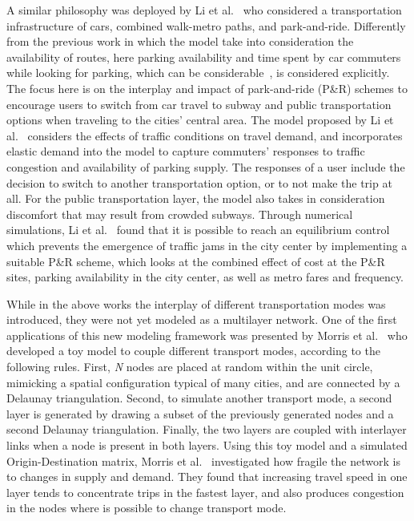 A similar philosophy was deployed by Li et al.~\cite{li2007parkride} who considered a transportation infrastructure of cars, combined walk-metro paths, and park-and-ride. Differently from the previous work in which the model take into consideration the availability of routes, here parking availability and time spent by car commuters while looking for parking, which can be considerable~\cite{shoup2017high}, is considered explicitly. The focus here is on the interplay and impact of park-and-ride (P\&R) schemes to encourage users to switch from car travel to subway and public transportation options when traveling to the cities' central area. The model proposed by Li et al.~\cite{li2007parkride} considers the effects of traffic conditions on travel demand, and incorporates elastic demand into the model to capture commuters’ responses to traffic congestion and availability of parking supply. The responses of a user include the decision to switch to another transportation option, or to not make the trip at all. For the public transportation layer, the model also takes in consideration discomfort that may result from crowded subways. Through numerical simulations, Li et al.~\cite{li2007parkride} found that it is possible to reach an equilibrium control which prevents the emergence of traffic jams in the city center by implementing a suitable P\&R scheme, which looks at the combined effect of cost at the P\&R sites, parking availability in the city center, as well as metro fares and frequency.

While in the above works the interplay of different transportation modes was introduced, they were not yet  modeled as a multilayer network. One of the first applications of this new modeling framework was presented by Morris et al.~\cite{morris2012transport} who developed a toy model to couple different transport modes, according to the following rules. First, \textit{N} nodes are placed at random within the unit circle, mimicking a spatial configuration typical of many cities, and are connected by a Delaunay triangulation. Second, to simulate another transport mode, a second layer is generated by drawing a subset of the previously generated nodes and a second Delaunay triangulation. Finally, the two layers are coupled with interlayer links when a node is present in both layers. Using this toy model and a simulated Origin-Destination matrix, Morris et al.~\cite{morris2012transport} investigated how fragile the network is to changes in supply and demand. They found that increasing travel speed in one layer tends to concentrate trips in the fastest layer, and also produces congestion in the nodes where is possible to change transport mode.

